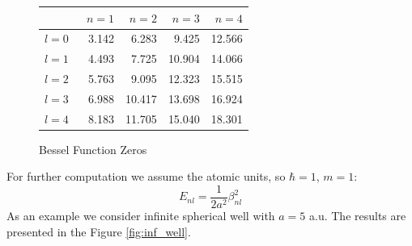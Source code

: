 \documentclass[a4paper, 11pt]{article}
\begin{document}
\begin{figure}[h!]
\centering
\begin{tabular}{lrrrr}
\toprule
{} &  \ $n=1$ &   $n=2$ &   $n=3$ &   $n=4$ \\
\midrule
$l=0$ &  3.142 &   6.283 &   9.425 &  12.566 \\
$l=1$ &  4.493 &   7.725 &  10.904 &  14.066 \\
$l=2$ &  5.763 &   9.095 &  12.323 &  15.515 \\
$l=3$ &  6.988 &  10.417 &  13.698 &  16.924 \\
$l=4$ &  8.183 &  11.705 &  15.040 &  18.301 \\
\bottomrule
\end{tabular}
\caption{Bessel Function Zeros}
\label{bess_0}
\end{figure}
For further computation we assume the atomic units, so $\hbar =  1$, $m=  1$:
$$E_{nl} = \frac{1}{2a^2}\beta_{nl}^2$$
As an example we consider infinite spherical well with $a= 5$ a.u.
The results are presented in the Figure \ref{fig:inf_well}.
\end{document}
